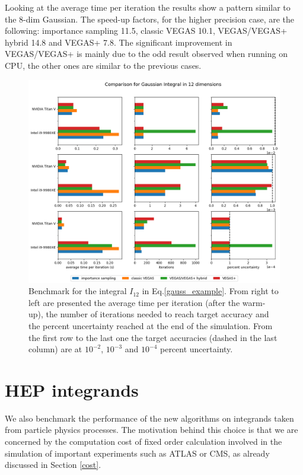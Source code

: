 \documentclass[../main/main.tex]{subfiles}
\begin{document}
Looking at the average time per iteration the results show a pattern similar to the 8-dim Gaussian. The speed-up factors, for the higher precision case, are the following: importance sampling 11.5, classic VEGAS 10.1, VEGAS/VEGAS+ hybrid 14.8 and VEGAS+ 7.8.
The significant improvement in VEGAS/VEGAS+ is mainly due to the odd result observed when running on CPU, the other ones are similar to the previous cases.

\begin{figure}
	\centering
	\includegraphics[width=\textwidth]{../images/gauss12d_final.png}
	\caption{Benchmark  for the integral $I_{12}$ in Eq.\eqref{gauss_example}. From right to left are presented the average time per iteration (after the warm-up), the number of iterations needed to reach target accuracy and the percent uncertainty reached at the end of the simulation. From the first row to the last one the target accuracies (dashed in the last column) are at $10^{-2}$, $10^{-3}$ and $10^{-4}$ percent uncertainty.}
	\label{gauss12d}
\end{figure}


\section{HEP integrands}
We also benchmark the performance of the new algorithms on integrands taken from particle physics processes.
The motivation behind this choice is that we are concerned by the computation cost of fixed order calculation involved in the simulation
of important experiments such as ATLAS or CMS, as already discussed in Section \ref{cost}.
\end{document}

